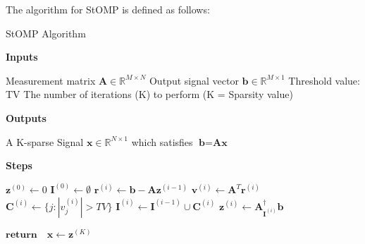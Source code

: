 \documentclass[titlepage,oneside, 12pt]{book}
\theoremstyle{break}
\begin{document}
\newpage

The algorithm for StOMP is defined as follows:

\begin{algorithm}
  \caption{StOMP Algorithm}
  \bigskip	
  \textbf{Inputs}%
  \begin{algorithmic}[1]
    \State Measurement matrix $\textbf{A} \in \mathbb{R}^{M \times N}$
    \State Output signal vector $\textbf{b} \in \mathbb{R}^{M \times 1}$
    \State Threshold value: TV
    \State The number of iterations (K) to perform (K = Sparsity value)
  \end{algorithmic}
  \bigskip  
  \textbf{Outputs}%
  \begin{algorithmic}[1]
    \State A K-sparse Signal $\textbf{x}\in \mathbb{R}^{N \times 1}$ which satisfies $\textbf{b} = \textbf{A}\textbf{x}$
  \end{algorithmic}
  \bigskip
  \textbf{Steps}%
  \begin{algorithmic}[1]
\State $\textbf{z}^{(0)} \gets 0$
   \State $\textbf{I}^{(0)} \gets \emptyset$
   \State $\textbf{r}^{(i)} \gets \textbf{b} - \textbf{A}\textbf{z}^{(i-1)}$ 
   \State $\textbf{v}^{(i)} \gets \textbf{A}^{T}\textbf{r}^{(i)}$  
   \State $\textbf{C}^{(i)} \gets \{j : |v^{(i)}_j| > TV\}$ 
   \State $\textbf{I}^{(i)} \gets \textbf{I}^{(i-1)} \cup \textbf{C}^{(i)}$
   \State $\textbf{z}^{(i)} \gets \textbf{A}^{\dagger}_{\textbf{I}^{(i)}}\textbf{b}$ 
   \EndFor
   
   \State $\textbf{return} \quad \textbf{x} \gets \textbf{z}^{(K)}$
   \EndProcedure

  \end{algorithmic}
  
\end{algorithm}
\end{document}
